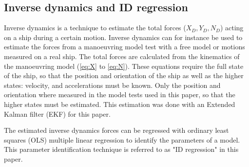 \subsection{Inverse dynamics and ID regression}
\label{sec:inverse_dynamics}
Inverse dynamics is a technique to estimate the total forces ($X_D,Y_D,N_D$) acting on a ship during a certain motion. Inverse dynamics can for instance be used to estimate the forces from a manoeuvring model test with a free model or motions measured on a real ship. The total forces are calculated from the kinematics of the manoeuvring model (\autoref{eq:X} to \autoref{eq:N}). These equations require the full state of the ship, so that the position and orientation of the ship as well as the higher states: velocity, and accelerations must be known. 
Only the position and orientation where measured in the model tests used in this paper, so that the higher states must be estimated. This estimation was done with an Extended Kalman filter (EKF) for this paper.

The estimated inverse dynamics forces can be regressed with ordinary least squares (OLS) multiple
linear regression to identify the parameters of a model. This parameter identification technique is referred to as "ID regression" in this paper.